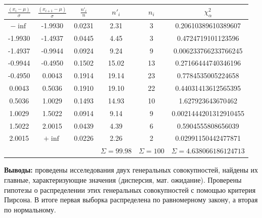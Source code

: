 \documentclass[a4paper, 12pt]{article}
\begin{document}
	\begin{center}
		\begin{tabular}{|c|c|c|c|c|c|}
			\hline
			$\frac{(x_i - \mu)}{\sigma}$ & $\frac{(x_{i+1} - \mu)}{\sigma}$ & $\frac{n'_i}{n}$ & $n'_i$ & $n_i$ & $\chi_\alpha^2$ \\
			\hline
			$-\inf$ & -1.9930 & 0.0231 & 2.31 & 3 & 0.20610389610389607\\
			\hline
			-1.9930 & -1.4937 & 0.0445 & 4.45 & 3 & 0.4724719101123596\\
			\hline
			-1.4937 & -0.9944 & 0.0924 & 9.24 & 9 &0.006233766233766245 \\
			\hline
			-0.9944 & -0.4950 & 0.1502 & 15.02 & 13 & 0.27166444740346196 \\
			\hline
			-0.4950 & 0.0043 & 0.1914 & 19.14 & 23 & 0.7784535005224658 \\
			\hline
			0.0043 & 0.5036 & 0.1910 & 19.10 & 22 & 0.44031413612565395\\
			\hline
			0.5036 & 1.0029 & 0.1493 & 14.93 & 10 & 1.627923643670462 \\
			\hline
			1.0029 & 1.5022 & 0.0914 & 9.14 & 9 & 0.0021444201312910455 \\
			\hline
			1.5022 & 2.0015 & 0.0439 & 4.39 & 6 & 0.5904555808656039\\
			\hline
			2.0015 & $+\inf$ & 0.0226 & 2.26 & 2  & 0.02991150442477871\\
			\hline
			\multicolumn{3}{|r|}{} & $\Sigma = 99.98$ & $\Sigma = 100$ & $\Sigma = 4.638066186124713$ \\
			\hline
		
		\end{tabular}
	\end{center}
	
	
	
	\quad \textbf{Выводы:} проведены исселедования двух генеральных совокупностей, найдены их главные, характеризующие значения (дисперсия, мат. ожидание). Проверены гипотезы о распределении этих генеральных совокупностей с помощью критерия Пирсона. В итоге первая выборка распределена по равномерному закону, а вторая по нормальному. 

	
	
	
\end{document}
